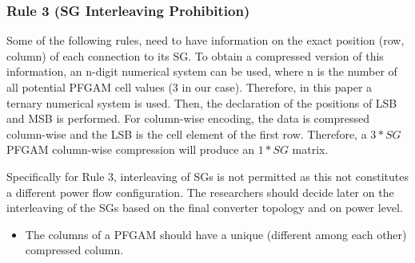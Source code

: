 \documentclass[conference]{IEEEtran}
\begin{document}
\subsubsection{Rule 3 (SG Interleaving Prohibition)} 
Some of the following rules, need to have information on the exact position (row, column) of each connection to its SG. To obtain a compressed version of this information, an n-digit numerical system can be used, where n is the number of all potential PFGAM cell values (3 in our case). Therefore, in this paper a ternary numerical system is used. Then, the declaration of the positions of LSB and MSB is performed. For column-wise encoding, the data is compressed column-wise and the LSB is the cell element of the first row. Therefore, a $3*SG$ PFGAM column-wise compression will produce an $1*SG$ matrix.

Specifically for Rule 3, interleaving of SGs is not permitted as this not constitutes a different power flow configuration. The researchers should decide later on the interleaving of the SGs based on the final converter topology and on power level.
\begin{itemize}
    \item The columns of a PFGAM should have a unique (different among each other) compressed column.
\end{itemize}
\end{document}
